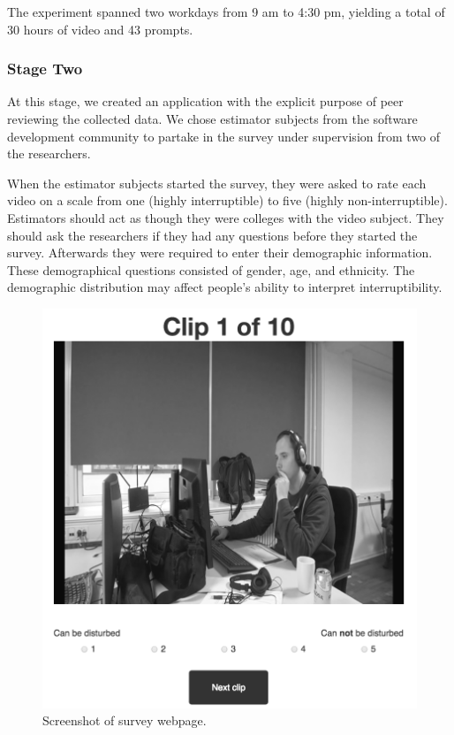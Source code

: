 \documentclass{sigchi}
\begin{document}
The experiment spanned two workdays from 9 am to 4:30 pm, yielding a total of 30 hours of video and 43 prompts.

\subsubsection{Stage Two}
\label{stage_two}
At this stage, we created an application with the explicit purpose of peer reviewing the collected data.
We chose estimator subjects from the software development community to partake in the survey under supervision from two of the researchers.

When the estimator subjects started the survey, they were asked to rate each video on a scale from one (highly interruptible) to five (highly non-interruptible).
Estimators should act as though they were colleges with the video subject.
They should ask the researchers if they had any questions before they started the survey.
Afterwards they were required to enter their demographic information.
These demographical questions consisted of gender, age, and ethnicity.
The demographic distribution may affect people's ability to interpret interruptibility.

\begin{figure}
  \centering
  \includegraphics[width=\columnwidth]{figures/webpage_screenshot.png}
  \caption{Screenshot of survey webpage.}
  \label{fig:webpage}
\end{figure}
\end{document}
